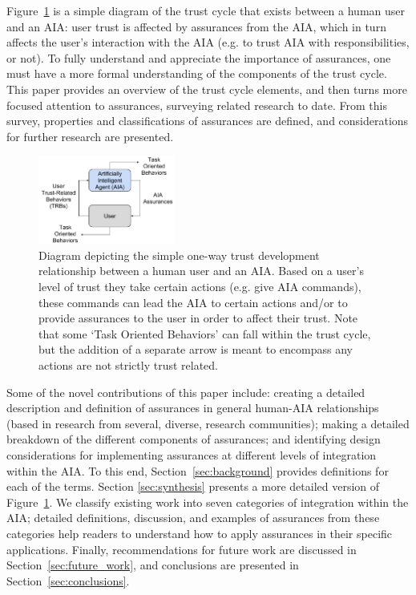 Figure~\ref{fig:SimpleTrust_one_way} is a simple diagram of the trust cycle that exists between a human user and an AIA: user trust is affected by assurances from the AIA, which in turn affects the user's interaction with the AIA (e.g. to trust AIA with responsibilities, or not). To fully understand and appreciate the importance of assurances, one must have a more formal understanding of the components of the trust cycle. This paper provides an overview of the trust cycle elements, and then turns more focused attention to assurances, surveying related research to date. From this survey, properties and classifications of assurances are defined, and considerations for further research are presented. 
%
\begin{figure}
    \centering
    \includegraphics[width=0.4\textwidth]{Figures/SimpleTrust_one_way}
    \caption{Diagram depicting the simple one-way trust development relationship between a human user and an AIA. Based on a user's level of trust they take certain actions (e.g. give AIA commands), these commands can lead the AIA to certain actions and/or to provide assurances to the user in order to affect their trust. Note that some `Task Oriented Behaviors' can fall within the trust cycle, but the addition of a separate arrow is meant to encompass any actions are not strictly trust related.}
    \label{fig:SimpleTrust_one_way}
\end{figure}
%
Some of the novel contributions of this paper include: creating a detailed description and definition of assurances in general human-AIA relationships (based in research from several, diverse, research communities); making a detailed breakdown of the different components of assurances; and identifying design considerations for implementing assurances at different levels of integration within the AIA. To this end, Section~\ref{sec:background} provides definitions for each of the terms. Section \ref{sec:synthesis} presents a more detailed version of Figure~\ref{fig:SimpleTrust_one_way}. We classify existing work into seven categories of integration within the AIA; detailed definitions, discussion, and examples of assurances from these categories help readers to understand how to apply assurances in their specific applications. Finally, recommendations for future work are discussed in Section~\ref{sec:future_work}, and conclusions are presented in Section~\ref{sec:conclusions}.

